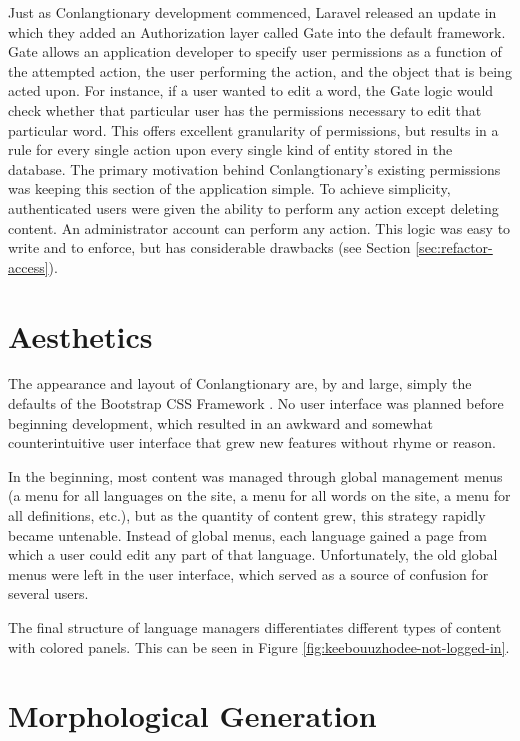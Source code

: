 Just as Conlangtionary development commenced, Laravel released an update in which they added an Authorization layer called Gate into the default framework. Gate allows an application developer to specify user permissions as a function of the attempted action, the user performing the action, and the object that is being acted upon. For instance, if a user wanted to edit a word, the Gate logic would check whether that particular user has the permissions necessary to edit that particular word. This offers excellent granularity of permissions, but results in a rule for every single action upon every single kind of entity stored in the database. The primary motivation behind Conlangtionary's existing permissions was keeping this section of the application simple. To achieve simplicity, authenticated users were given the ability to perform any action except deleting content. An administrator account can perform any action. This logic was easy to write and to enforce, but has considerable drawbacks (see Section \ref{sec:refactor-access}).

\section{Aesthetics}
\label{sec:aesthetics}

The appearance and layout of Conlangtionary are, by and large, simply the defaults of the Bootstrap CSS Framework \cite{Bootstrap}. No user interface was planned before beginning development, which resulted in an awkward and somewhat counterintuitive user interface that grew new features without rhyme or reason.

In the beginning, most content was managed through global management menus (a menu for all languages on the site, a menu for all words on the site, a menu for all definitions, etc.), but as the quantity of content grew, this strategy rapidly became untenable. Instead of global menus, each language gained a page from which a user could edit any part of that language. Unfortunately, the old global menus were left in the user interface, which served as a source of confusion for several users.

The final structure of language managers differentiates different types of content with colored panels. This can be seen in Figure \ref{fig:keebouuzhodee-not-logged-in}.

\section{Morphological Generation}
\label{sec:morph-gen}

